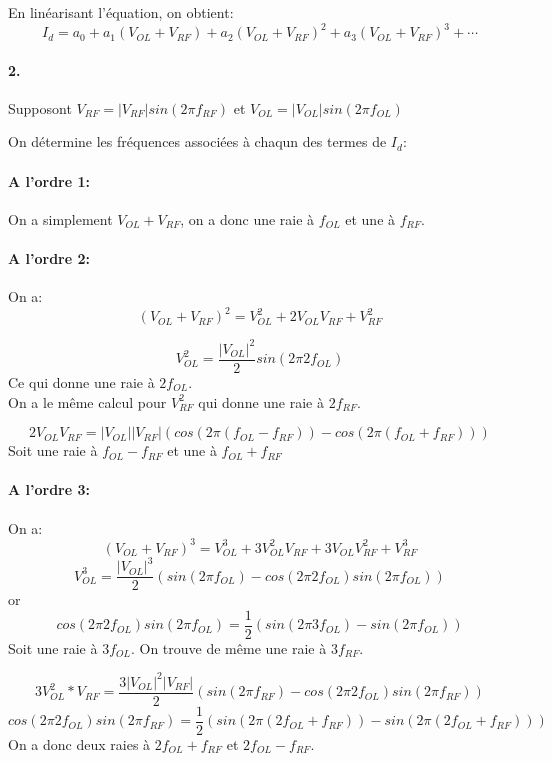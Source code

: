 \documentclass[oneside,a4paper,12pt]{article}
\begin{document}
	En linéarisant l'équation, on obtient:
	\[ I_{d} = a_{0} + a_{1}(V_{OL} + V_{RF}) + a_{2}(V_{OL} + V_{RF})^{2} + a_{3}(V_{OL} + V_{RF})^{3} + \cdots \]

	\paragraph{2.}
	Supposont $ V_{RF} = |V_{RF}|sin(2 \pi f_{RF}) $ et $ V_{OL} = |V_{OL}|sin(2 \pi f_{OL}) $

	On détermine les fréquences associées à chaqun des termes de $I_{d}$:

	\paragraph{A l'ordre 1:} 
	On a simplement $V_{OL} + V_{RF}$, on a donc une raie à $f_{OL}$ et une à $f_{RF}$.
	
	\paragraph{A l'ordre 2:}

	On a:
	\[ (V_{OL} + V_{RF})^{2} = V_{OL}^{2} + 2V_{OL}V_{RF} + V_{RF}^{2} \]

	\[ V_{OL}^{2} = \frac{|V_{OL}|^{2}}{2} sin(2 \pi 2 f_{OL}) \]
	Ce qui donne une raie à $2f_{OL}$.\\
	On a le même calcul pour $V_{RF}^{2}$ qui donne une raie à $2f_{RF}$.

	\[ 2 V_{OL} V_{RF} = |V_{OL}||V_{RF}|(cos(2 \pi (f_{OL} - f_{RF})) - cos(2 \pi (f_{OL} + f_{RF}))) \]
	 Soit une raie à $f_{OL}-f_{RF}$ et une à $f_{OL}+f_{RF}$

	\paragraph{A l'ordre 3:}
	On a:
	\[ (V_{OL} + V_{RF})^{3} = V_{OL}^{3} + 3V_{OL}^{2}V_{RF} + 3V_{OL}V_{RF}^{2} + V_{RF}^{3} \]
	\[ V_{OL}^{3} = \frac{|V_{OL}|^{3}}{2} ( sin(2 \pi f_{OL}) - cos(2 \pi 2 f_{OL}) sin(2 \pi f_{OL}) ) \]
	or \[ cos(2 \pi 2 f_{OL}) sin(2 \pi f_{OL}) = \frac{1}{2} ( sin(2 \pi 3 f_{OL}) - sin(2 \pi f_{OL}) ) \]
	Soit une raie à $3 f_{OL}$.
	On trouve de même une raie à $3 f_{RF}$.

	\[ 3 V_{OL}^{2} * V_{RF} = \frac{3 |V_{OL}|^{2} |V_{RF}|}{2} (sin(2 \pi f_{RF}) - cos(2 \pi 2 f_{OL}) sin(2 \pi f_{RF}) ) \]
	\[ cos(2 \pi 2 f_{OL}) sin(2 \pi f_{RF}) = \frac{1}{2} (sin(2 \pi ( 2 f_{OL} + f_{RF})) - sin(2 \pi (2 f_{OL} + f_{RF})) ) \]
	On a donc deux raies à $2 f_{OL} + f_{RF}$ et $2 f_{OL} - f_{RF}$.
\end{document}
